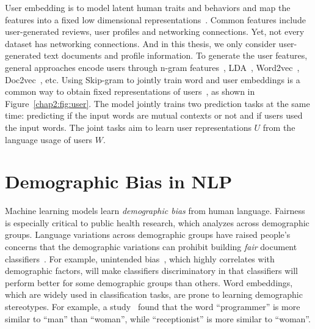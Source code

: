 User embedding is to model latent human traits and behaviors and map the features into a fixed low dimensional representations~\cite{pan2019social}. 
Common features include user-generated reviews, user profiles and networking connections. 
Yet, not every dataset has networking connections. 
And in this thesis, we only consider user-generated text documents and profile information.
To generate the user features, general approaches encode users through n-gram features~\cite{benton2016learning}, LDA~\cite{zhang2015using, ding2017multi}, Word2vec~\cite{amir2016modelling, benton2016learning, amir2017quantifying, wu2018starspace}, Doc2vec~\cite{ding2017multi, ding2018predicting}, etc.
Using Skip-gram to jointly train word and user embeddings is a common way to obtain fixed representations of users~\cite{amir2017quantifying, wu2018starspace}, as shown in Figure~\ref{chap2:fig:user}.
The model jointly trains two prediction tasks at the same time: predicting if the input words are mutual contexts or not and if users used the input words.
The joint tasks aim to learn user representations $U$ from the language usage of users $W$.


\section{Demographic Bias in NLP}

Machine learning models learn \textit{demographic bias} from human language.
Fairness is especially critical to public health research, which analyzes across demographic groups. 
Language variations across demographic groups have raised people's concerns that the demographic variations can prohibit building \textit{fair} document classifiers~\cite{sun2019mitigating, bender2018data}. 
For example, unintended bias~\cite{dixon2018measuring}, which highly correlates with demographic factors, will make classifiers discriminatory in that classifiers will perform better for some demographic groups than others. 
Word embeddings, which are widely used in classification tasks, are prone to learning demographic stereotypes.
For example, a study~\cite{bolukbasi2016man} found that the word ``programmer'' is more similar to ``man'' than ``woman'', while ``receptionist'' is more similar to ``woman''.


